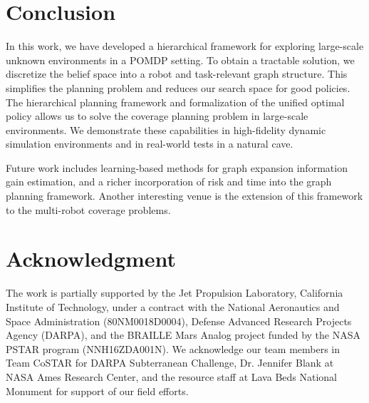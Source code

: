 \documentclass[letterpaper]{article} %
\begin{document}
\section{Conclusion}\label{sec:conclusion}

In this work, we have developed a hierarchical framework for exploring large-scale unknown environments in a POMDP setting. 
To obtain a tractable solution, we discretize the belief space into a robot and task-relevant graph structure. This simplifies the planning problem and reduces our search space for good policies.
The hierarchical planning framework and formalization of the unified optimal policy allows us to solve the coverage planning problem in large-scale environments.
We demonstrate these capabilities in high-fidelity dynamic simulation environments and in real-world tests in a natural cave.  

Future work includes learning-based methods for graph expansion information gain estimation, and a richer incorporation of risk and time into the graph planning framework.
Another interesting venue is the extension of this framework to the multi-robot coverage problems.


\section*{Acknowledgment}
The work is partially supported by the Jet Propulsion Laboratory, California Institute of Technology, under a contract with the National Aeronautics and Space Administration (80NM0018D0004), Defense Advanced Research Projects Agency (DARPA), and the BRAILLE Mars Analog project funded by the NASA PSTAR program (NNH16ZDA001N).
We acknowledge our team members in Team CoSTAR for DARPA Subterranean Challenge, Dr. Jennifer Blank at NASA Ames Research Center, and the resource staff at Lava Beds National Monument for support of our field efforts.



\end{document}
